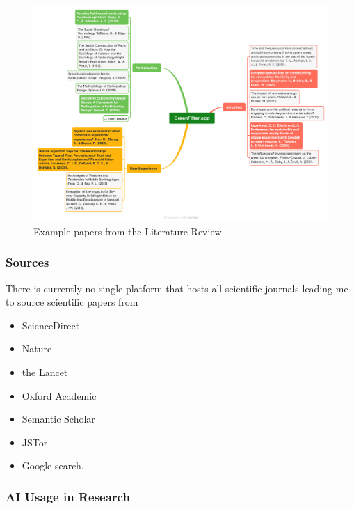 \documentclass[
  letterpaper,
  DIV=11,
  numbers=noendperiod]{scrartcl}
\providecommand{\tightlist}{%
  \setlength{\itemsep}{0pt}\setlength{\parskip}{0pt}}\usepackage{longtable,booktabs,array}
\begin{document}
\begin{figure}[H]

{\centering \includegraphics[width=1\linewidth,height=\textheight,keepaspectratio]{./images/literature/literature.png}

}

\caption{Example papers from the Literature Review}

\end{figure}%

\subsubsection{Sources}\label{sources}

There is currently no single platform that hosts all scientific journals
leading me to source scientific papers from

\begin{itemize}
\tightlist
\item
  ScienceDirect
\item
  Nature
\item
  the Lancet
\item
  Oxford Academic
\item
  Semantic Scholar
\item
  JSTor
\item
  Google search.
\end{itemize}

\subsubsection{AI Usage in Research}\label{ai-usage-in-research}
\end{document}
